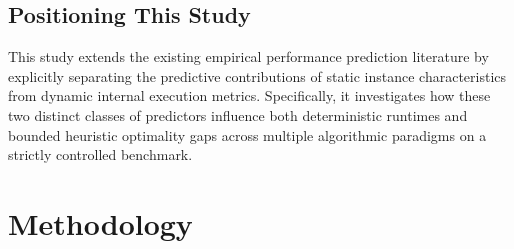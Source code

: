 \documentclass[11pt,a4paper]{article}
\begin{document}
\subsection{Positioning This Study}
This study extends the existing empirical performance prediction literature by explicitly separating the predictive contributions of static instance characteristics from dynamic internal execution metrics. Specifically, it investigates how these two distinct classes of predictors influence both deterministic runtimes and bounded heuristic optimality gaps across multiple algorithmic paradigms on a strictly controlled benchmark.

\section{Methodology}
\end{document}
